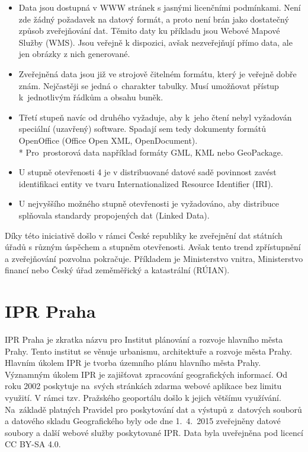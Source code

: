 \begin{itemize}

    \item   Data jsou dostupná v WWW stránek s jasnými licenčními
            podmínkami. Není zde žádný požadavek na datový formát,
            a proto není brán jako dostatečný způsob zveřejňování dat.
            Těmito daty ku příkladu jsou Webové Mapové Služby (WMS).
            Jsou veřejně k dispozici, avšak nezveřejňují přímo data,
            ale jen obrázky z nich generované.

    \item   Zveřejněná data jsou již ve strojově čitelném formátu,
            který je veřejně dobře znám. Nejčastěji se jedná
            o~charakter tabulky. Musí umožňovat přístup k~jednotlivým
            řádkům a obsahu buněk.

    \item   Třetí stupeň navíc od druhého vyžaduje, aby k~jeho čtení
            nebyl vyžadován speciální (uzavřený) software. Spadají sem tedy dokumenty formátů
            OpenOffice (Office Open XML, OpenDocument).
        \\* Pro~prostorová data například formáty GML, KML nebo
            GeoPackage.

    \item   U stupně otevřenosti 4 je v distribuované datové sadě
            povinnost zavést identifikaci entity ve tvaru
            Internationalized Resource Identifier (IRI).

    \item   U nejvyššího možného stupně otevřenosti je vyžadováno, aby
            distribuce splňovala standardy propojených dat (Linked
            Data). \cite{OpendataStupne}

\end{itemize}

Díky této iniciativě došlo v rámci České republiky ke zveřejnění
dat státních úřadů s různým úspěchem a stupněm otevřenosti.
Avšak tento trend zpřístupnění a zveřejňování pozvolna pokračuje.
Příkladem je Ministerstvo vnitra, Ministerstvo financí nebo Český úřad zeměměřický a katastrální (RÚIAN).


\section{IPR Praha}
\label{IPR Praha}
IPR Praha je zkratka názvu pro Institut plánování a rozvoje
hlavního města Prahy. Tento institut se věnuje urbanismu, architektuře
a rozvoje města Prahy. Hlavním úkolem IPR je tvorba územního plánu
hlavního města Prahy. Významným úkolem IPR je zajišťovat zpracování geografických
informací. Od roku 2002 poskytuje
na~svých stránkách zdarma webové aplikace bez limitu využití.
V rámci tzv. Pražského geoportálu došlo k jejich většímu využívání.
Na~základě platných Pravidel pro poskytování dat a výstupů z~datových
souborů a datového skladu Geografického byly ode dne 1.~4.~2015
zveřejněny datové soubory a další webové služby poskytované IPR. Data byla
uveřejněna pod licencí CC BY-SA 4.0. \cite{IPR}

